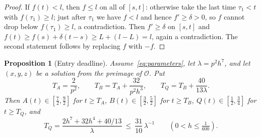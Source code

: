 \documentclass[11pt,a4paper]{article}
\theoremstyle{plain}
\newtheorem{proposition}[theorem]{Proposition}
\theoremstyle{definition}
\theoremstyle{remark}
\newcommand{\calO}{\mathcal O}
\begin{document}
\begin{proof}
If $f(t)<l$, then $f\le l$ on all of $[s,t]$: otherwise take the last time $\tau_1<t$ with $f(\tau_1)\ge l$; just after $\tau_1$ we have $f<l$ and hence $f'\ge\delta>0$, so $f$ cannot drop below $f(\tau_1)\ge l$, a contradiction. Then $f'\ge\delta$ on $[s,t]$ and $f(t)\ge f(s)+\delta(t-s)\ge L+(l-L)=l$, again a contradiction. The second statement follows by replacing $f$ with $-f$.
\end{proof}

\begin{proposition}[Entry deadline]\label{prop:deadline}
Assume~\eqref{eq:parameters}, let $\lambda=p^2h^7$, and let $(x,y,z)$ be a solution from the preimage of $\calO$. Put
\begin{equation}\label{eq:phases}
 T_A=\frac{2}{p^2},\qquad T_B=T_A+\frac{32}{p^2h^3},\qquad T_Q=T_B+\frac{40}{13\lambda}.
\end{equation}
Then $A(t)\in[\tfrac72,\tfrac92]$ for $t\ge T_A$, $B(t)\in[\tfrac32,\tfrac52]$ for $t\ge T_B$, $Q(t)\in[\tfrac12,\tfrac34]$ for $t\ge T_Q$, and
\begin{equation}\label{eq:sequential-deadline}
 T_Q=\frac{2h^7+32h^4+40/13}{\lambda}\ \le\ \frac{31}{10}\,\lambda^{-1}\qquad(0<h\le\tfrac1{600}).
\end{equation}
\end{proposition}
\end{document}
